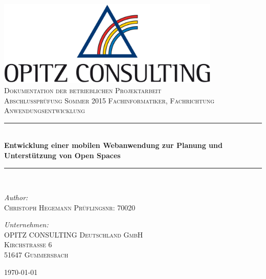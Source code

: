 \begin{titlepage}
\begin{center}

\includegraphics[width=0.80\textwidth]{img/oc-logo.jpg}\\[1cm]

\textsc{\LARGE Dokumentation der betrieblichen Projektarbeit}\\[1.5cm]

\textsc{\Large Abschlussprüfung Sommer 2015 Fachinformatiker, Fachrichtung Anwendungsentwicklung}\\[0.5cm]

\newcommand{\HRule}{\rule{\linewidth}{0.5mm}}
\HRule\\[0.4cm]
{ \huge \bfseries Entwicklung einer mobilen Webanwendung zur Planung und Unterstützung von Open Spaces}\\[0.4cm]
\HRule\\[1.0cm]

\begin{minipage}{0.4\textwidth}
\begin{flushleft} \large
\emph{Author:}\\
\textsc{Christoph Hegemann}
\textsc{Prüflingsnr: 70020}
\end{flushleft}
\end{minipage}
\hfill
\begin{minipage}{0.5\textwidth}
\begin{flushright} \large
\emph{Unternehmen:} \\
\textsc{OPITZ CONSULTING Deutschland GmbH}\\
\textsc{Kirchstraße 6}\\
\textsc{51647 Gummersbach}\\
\end{flushright}
\end{minipage}

\vfill
{\large \today}
\end{center}
\end{titlepage}

